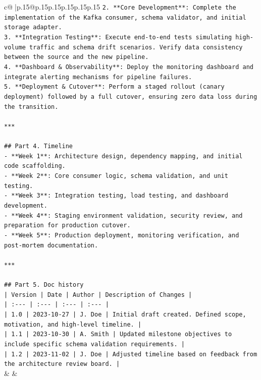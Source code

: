 \documentclass{article}
\begin{document}
{\begin{supertabular}{c@{$\;$}|p{.15\linewidth}@{}p{.15\linewidth}p{.15\linewidth}p{.15\linewidth}p{.15\linewidth}p{.15\linewidth}}
{{{\texttt{2.  **Core Development**: Complete the implementation of the Kafka consumer, schema validator, and initial storage adapter.} \\
\texttt{3.  **Integration Testing**: Execute end{-}to{-}end tests simulating high{-}volume traffic and schema drift scenarios. Verify data consistency between the source and the new pipeline.} \\
\texttt{4.  **Dashboard \& Observability**: Deploy the monitoring dashboard and integrate alerting mechanisms for pipeline failures.} \\
\texttt{5.  **Deployment \& Cutover**: Perform a staged rollout (canary deployment) followed by a full cutover, ensuring zero data loss during the transition.} \\
\\ 
\texttt{***} \\
\\ 
\texttt{\#\# Part 4. Timeline} \\
\texttt{{-} **Week 1**: Architecture design, dependency mapping, and initial code scaffolding.} \\
\texttt{{-} **Week 2**: Core consumer logic, schema validation, and unit testing.} \\
\texttt{{-} **Week 3**: Integration testing, load testing, and dashboard development.} \\
\texttt{{-} **Week 4**: Staging environment validation, security review, and preparation for production cutover.} \\
\texttt{{-} **Week 5**: Production deployment, monitoring verification, and post{-}mortem documentation.} \\
\\ 
\texttt{***} \\
\\ 
\texttt{\#\# Part 5. Doc history} \\
\texttt{| Version | Date | Author | Description of Changes |} \\
\texttt{| :{-}{-}{-} | :{-}{-}{-} | :{-}{-}{-} | :{-}{-}{-} |} \\
\texttt{| 1.0 | 2023{-}10{-}27 | J. Doe | Initial draft created. Defined scope, motivation, and high{-}level timeline. |} \\
\texttt{| 1.1 | 2023{-}10{-}30 | A. Smith | Updated milestone objectives to include specific schema validation requirements. |} \\
\texttt{| 1.2 | 2023{-}11{-}02 | J. Doe | Adjusted timeline based on feedback from the architecture review board. |} \\
            }
        }
    }
    & & \\ \\


\end{supertabular}}
\end{document}
